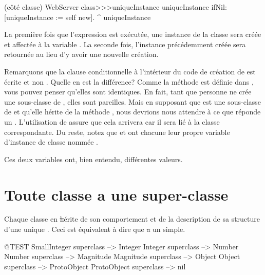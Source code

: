 \documentclass[a4paper,10pt,twoside]{book}
\begin{document}
\begin{method}[uniqueInstance]{ (côté classe)}
WebServer class>>>uniqueInstance
     uniqueInstance ifNil: [uniqueInstance := self new].
     ^ uniqueInstance
\end{method}

La première fois que l'expression  est exécutée, une instance de la classe  sera créée et affectée à la variable . 
La seconde fois, l'instance précédemment créée sera retournée au lieu d'y avoir une nouvelle création. 

Remarquons que la clause conditionnelle à l'intérieur du code de création
de  est écrite  et non 
\mbox{.}
Quelle en est la différence?   Comme la méthode  est définie dans \mbox{,} vous pouvez penser qu'elles sont identiques.    En fait, tant que personne ne crée une sous-classe de , elles sont pareilles. Mais en supposant que  est une sous-classe de  et qu'elle hérite de la méthode ,
nous devrions nous attendre à ce que  réponde un . L'utilisation de \self assure que cela arrivera car il sera lié à la classe correspondante.
Du reste, notez que  et  ont chacune
leur propre variable d'instance de classe nommée .  

Ces deux variables ont, bien entendu, différentes valeurs.

\section{Toute classe a une super-classe}


Chaque classe en \st hérite de son comportement et de la description
de sa structure d'une unique .
Ceci est équivalent à dire que \st a un  simple.

\begin{code}{@TEST}
SmallInteger superclass --> Integer
Integer superclass          --> Number
Number superclass        --> Magnitude
Magnitude superclass    --> Object
Object superclass           --> ProtoObject
ProtoObject superclass  --> nil
\end{code}
\end{document}
